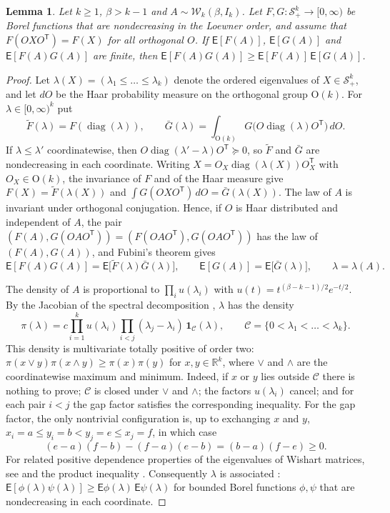 \documentclass{amsart}
\newtheorem{lemma}[theorem]{Lemma}
\theoremstyle{definition}
\theoremstyle{remark}
\numberwithin{equation}{section}
\newcommand{\R}{\mathbb{R}}
\newcommand{\E}{\mathsf{E}}
\newcommand{\Sym}{\mathcal{S}}
\newcommand{\W}{\mathcal{W}}
\newcommand{\diag}{\operatorname{diag}}
\begin{document}
\begin{lemma}\label{lem:assoc}
Let $k\ge1$, $\beta>k-1$ and $A\sim\W_k(\beta,I_k)$. Let $F,G:\Sym^k_+\to[0,\infty)$ be Borel functions that are nondecreasing in the Loewner order, and assume that $F(OXO^{\mathsf T})=F(X)$ for all orthogonal $O$. If $\E[F(A)]$, $\E[G(A)]$ and $\E[F(A)G(A)]$ are finite, then $\E[F(A)G(A)]\ge\E[F(A)]\,\E[G(A)]$.
\end{lemma}

\begin{proof}
Let $\lambda(X)=(\lambda_1\le\dots\le\lambda_k)$ denote the ordered eigenvalues of $X\in\Sym^k_+$, and let $dO$ be the Haar probability measure on the orthogonal group $\mathrm O(k)$. For $\lambda\in[0,\infty)^k$ put
\[
\tilde F(\lambda)=F(\diag(\lambda)),\qquad\bar G(\lambda)=\int_{\mathrm O(k)}G\bigl(O\diag(\lambda)O^{\mathsf T}\bigr)\,dO .
\]
If $\lambda\le\lambda'$ coordinatewise, then $O\diag(\lambda'-\lambda)O^{\mathsf T}\succeq0$, so $\tilde F$ and $\bar G$ are nondecreasing in each coordinate. Writing $X=O_X\diag(\lambda(X))O_X^{\mathsf T}$ with $O_X\in\mathrm O(k)$, the invariance of $F$ and of the Haar measure give $F(X)=\tilde F(\lambda(X))$ and $\int G(OXO^{\mathsf T})\,dO=\bar G(\lambda(X))$. The law of $A$ is invariant under orthogonal conjugation. Hence, if $O$ is Haar distributed and independent of $A$, the pair $(F(A),G(OAO^{\mathsf T}))=(F(OAO^{\mathsf T}),G(OAO^{\mathsf T}))$ has the law of $(F(A),G(A))$, and Fubini's theorem gives
\begin{equation}\label{eq:haar}
\E[F(A)G(A)]=\E\bigl[\tilde F(\lambda)\bar G(\lambda)\bigr],\qquad\E[G(A)]=\E\bigl[\bar G(\lambda)\bigr],\qquad\lambda=\lambda(A).
\end{equation}

The density of $A$ is proportional to $\prod_iu(\lambda_i)$ with $u(t)=t^{(\beta-k-1)/2}e^{-t/2}$. By the Jacobian of the spectral decomposition \cite[Theorem~3.2.17]{Mui82}, $\lambda$ has the density
\[
\pi(\lambda)=c\prod_{i=1}^ku(\lambda_i)\prod_{i<j}(\lambda_j-\lambda_i)\,\mathbf 1_{\mathcal C}(\lambda),\qquad\mathcal C=\{0<\lambda_1<\dots<\lambda_k\}.
\]
This density is multivariate totally positive of order two: $\pi(x\vee y)\pi(x\wedge y)\ge\pi(x)\pi(y)$ for $x,y\in\R^k$, where $\vee$ and $\wedge$ are the coordinatewise maximum and minimum. Indeed, if $x$ or $y$ lies outside $\mathcal C$ there is nothing to prove; $\mathcal C$ is closed under $\vee$ and $\wedge$; the factors $u(\lambda_i)$ cancel; and for each pair $i<j$ the gap factor satisfies the corresponding inequality. For the gap factor, the only nontrivial configuration is, up to exchanging $x$ and $y$, $x_i=a\le y_i=b<y_j=e\le x_j=f$, in which case
\[
(e-a)(f-b)-(f-a)(e-b)=(b-a)(f-e)\ge0 .
\]
For related positive dependence properties of the eigenvalues of Wishart matrices, see \cite{DH78} and the product inequality \cite[Theorem~3.14]{GOR24a}. Consequently $\lambda$ is associated \cite{FKG71,KR80}: $\E[\phi(\lambda)\psi(\lambda)]\ge\E\phi(\lambda)\,\E\psi(\lambda)$ for bounded Borel functions $\phi,\psi$ that are nondecreasing in each coordinate.


\end{proof}
\end{document}
